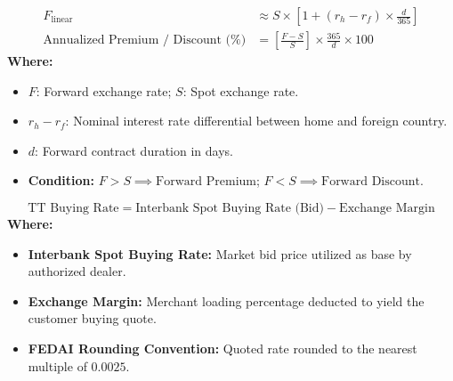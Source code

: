 \begin{formulabox}
\begin{align*}
    F_{\text{linear}} &\approx S \times \left[ 1 + (r_h - r_f) \times \frac{d}{365} \right] \\[0.3em]
    \text{Annualized Premium / Discount (\%)} &= \left[ \frac{F - S}{S} \right] \times \frac{365}{d} \times 100
\end{align*}
\textbf{Where:}
\begin{itemize}[leftmargin=*, noitemsep]
    \item $F$: Forward exchange rate; $S$: Spot exchange rate.
    \item $r_h - r_f$: Nominal interest rate differential between home and foreign country.
    \item $d$: Forward contract duration in days.
    \item \textbf{Condition:} $F > S \implies \text{Forward Premium}$; $F < S \implies \text{Forward Discount}$.
\end{itemize}
\end{formulabox}

\begin{formulabox}
\begin{equation*}
    \text{TT Buying Rate} = \text{Interbank Spot Buying Rate (Bid)} - \text{Exchange Margin}
\end{equation*}
\textbf{Where:}
\begin{itemize}[leftmargin=*, noitemsep]
    \item \textbf{Interbank Spot Buying Rate:} Market bid price utilized as base by authorized dealer.
    \item \textbf{Exchange Margin:} Merchant loading percentage deducted to yield the customer buying quote.
    \item \textbf{FEDAI Rounding Convention:} Quoted rate rounded to the nearest multiple of $0.0025$.
\end{itemize}
\end{formulabox}

